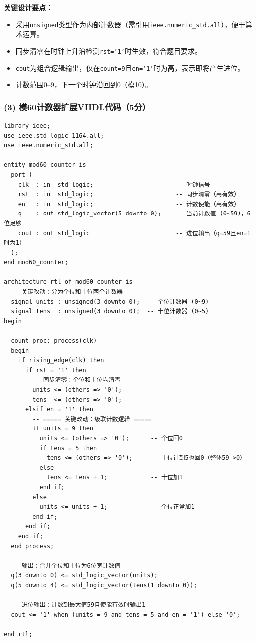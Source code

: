 \noindent\textbf{关键设计要点：}
\begin{itemize}
  \item 采用\texttt{unsigned}类型作为内部计数器（需引用\texttt{ieee.numeric\_std.all}），便于算术运算。
  \item 同步清零在时钟上升沿检测\texttt{rst='1'}时生效，符合题目要求。
  \item \texttt{cout}为组合逻辑输出，仅在\texttt{count=9}且\texttt{en='1'}时为高，表示即将产生进位。
  \item 计数范围0--9，下一个时钟沿回到0（模10）。
\end{itemize}

\subsubsection*{(3) 模60计数器扩展VHDL代码（5分）}

\begin{lstlisting}[caption={模60计数器（0--59）——扩展代码}, label={lst:ans04_mod60}]
library ieee;
use ieee.std_logic_1164.all;
use ieee.numeric_std.all;

entity mod60_counter is
  port (
    clk  : in  std_logic;                       -- 时钟信号
    rst  : in  std_logic;                       -- 同步清零（高有效）
    en   : in  std_logic;                       -- 计数使能（高有效）
    q    : out std_logic_vector(5 downto 0);    -- 当前计数值 (0~59)，6位足够
    cout : out std_logic                        -- 进位输出（q=59且en=1时为1）
  );
end mod60_counter;

architecture rtl of mod60_counter is
  -- 关键改动：分为个位和十位两个计数器
  signal units : unsigned(3 downto 0);  -- 个位计数器 (0~9)
  signal tens  : unsigned(3 downto 0);  -- 十位计数器 (0~5)
begin

  count_proc: process(clk)
  begin
    if rising_edge(clk) then
      if rst = '1' then
        -- 同步清零：个位和十位均清零
        units <= (others => '0');
        tens  <= (others => '0');
      elsif en = '1' then
        -- ===== 关键改动：级联计数逻辑 =====
        if units = 9 then
          units <= (others => '0');      -- 个位回0
          if tens = 5 then
            tens <= (others => '0');     -- 十位计到5也回0（整体59->0）
          else
            tens <= tens + 1;            -- 十位加1
          end if;
        else
          units <= units + 1;            -- 个位正常加1
        end if;
      end if;
    end if;
  end process;

  -- 输出：合并个位和十位为6位宽计数值
  q(3 downto 0) <= std_logic_vector(units);
  q(5 downto 4) <= std_logic_vector(tens(1 downto 0));

  -- 进位输出：计数到最大值59且使能有效时输出1
  cout <= '1' when (units = 9 and tens = 5 and en = '1') else '0';

end rtl;
\end{lstlisting}

